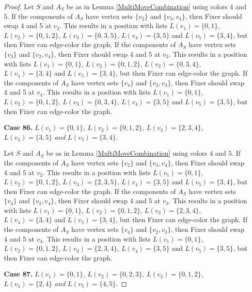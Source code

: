 \documentclass[12pt]{amsart}
\theoremstyle{plain}
\theoremstyle{definition}
\theoremstyle{remark}
\begin{document}
\begin{proof}
Let $S$ and $A_S$ be as in Lemma \ref{MultiMoveCombination} using colors $4$ and $5$. If the components of $A_S$ have vertex sets $\{v_2\}$ and $\{v_3, v_4\}$, then Fixer should swap 4 and 5 at $v_2$. This results in a position with lists $L(v_1) = \{0, 1\}$, $L(v_2) = \{0, 1, 2\}$, $L(v_3) = \{0, 3, 5\}$, $L(v_4) = \{3, 5\}$ and $L(v_5) = \{3, 4\}$, but then Fixer can edge-color the graph.
If the components of $A_S$ have vertex sets $\{v_3\}$ and $\{v_2, v_4\}$, then Fixer should swap 4 and 5 at $v_3$. This results in a position with lists $L(v_1) = \{0, 1\}$, $L(v_2) = \{0, 1, 2\}$, $L(v_3) = \{0, 3, 4\}$, $L(v_4) = \{3, 4\}$ and $L(v_5) = \{3, 4\}$, but then Fixer can edge-color the graph.
If the components of $A_S$ have vertex sets $\{v_4\}$ and $\{v_2, v_3\}$, then Fixer should swap 4 and 5 at $v_4$. This results in a position with lists $L(v_1) = \{0, 1\}$, $L(v_2) = \{0, 1, 2\}$, $L(v_3) = \{0, 3, 4\}$, $L(v_4) = \{3, 5\}$ and $L(v_5) = \{3, 5\}$, but then Fixer can edge-color the graph.

\noindent\textbf{Case 86.  }\textit{$L(v_1) = \{0, 1\}$, $L(v_2) = \{0, 1, 2\}$, $L(v_3) = \{2, 3, 4\}$, $L(v_4) = \{3, 5\}$ and $L(v_5) = \{3, 4\}$.}

Let $S$ and $A_S$ be as in Lemma \ref{MultiMoveCombination} using colors $4$ and $5$. If the components of $A_S$ have vertex sets $\{v_2\}$ and $\{v_3, v_4\}$, then Fixer should swap 4 and 5 at $v_2$. This results in a position with lists $L(v_1) = \{0, 1\}$, $L(v_2) = \{0, 1, 2\}$, $L(v_3) = \{2, 3, 5\}$, $L(v_4) = \{3, 5\}$ and $L(v_5) = \{3, 4\}$, but then Fixer can edge-color the graph.
If the components of $A_S$ have vertex sets $\{v_3\}$ and $\{v_2, v_4\}$, then Fixer should swap 4 and 5 at $v_3$. This results in a position with lists $L(v_1) = \{0, 1\}$, $L(v_2) = \{0, 1, 2\}$, $L(v_3) = \{2, 3, 4\}$, $L(v_4) = \{3, 4\}$ and $L(v_5) = \{3, 4\}$, but then Fixer can edge-color the graph.
If the components of $A_S$ have vertex sets $\{v_4\}$ and $\{v_2, v_3\}$, then Fixer should swap 4 and 5 at $v_4$. This results in a position with lists $L(v_1) = \{0, 1\}$, $L(v_2) = \{0, 1, 2\}$, $L(v_3) = \{2, 3, 4\}$, $L(v_4) = \{3, 5\}$ and $L(v_5) = \{3, 5\}$, but then Fixer can edge-color the graph.

\noindent\textbf{Case 87.  }\textit{$L(v_1) = \{0, 1\}$, $L(v_2) = \{0, 2, 3\}$, $L(v_3) = \{0, 1, 2\}$, $L(v_4) = \{2, 4\}$ and $L(v_5) = \{4, 5\}$.}


\end{proof}
\end{document}
